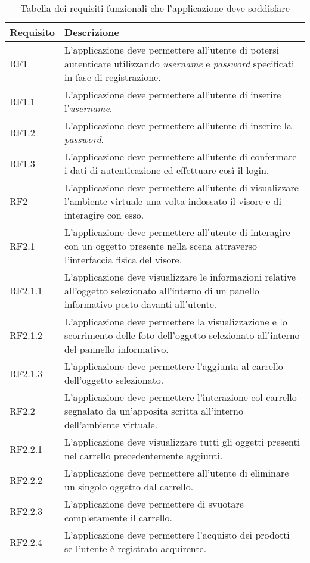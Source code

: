 \begin{table}
	\centering
	\label{tabella-requisiti}
	\begin{tabular}{| l | p{10cm} |}
		\hline
		\textbf{Requisito} & \textbf{Descrizione} \\ \hline
		RF1 & L'applicazione deve permettere all'utente di potersi autenticare utilizzando \textit{username} e \textit{password} specificati in fase di registrazione. \\ \hline
		RF1.1 & L'applicazione deve permettere all'utente di inserire l'\textit{username}. \\ \hline
		RF1.2 & L'applicazione deve permettere all'utente di inserire la \textit{password}. \\ \hline
		RF1.3 & L'applicazione deve permettere all'utente di confermare i dati di autenticazione ed effettuare così il login. \\ \hline
		RF2 & L'applicazione deve permettere all'utente di visualizzare l'ambiente virtuale una volta indossato il visore e di interagire con esso. \\ \hline
		RF2.1 & L'applicazione deve permettere all'utente di interagire con un oggetto presente nella scena attraverso l'interfaccia fisica del visore. \\ \hline
		RF2.1.1 & L'applicazione deve visualizzare le informazioni relative all'oggetto selezionato all'interno di un panello informativo posto davanti all'utente. \\ \hline
		RF2.1.2 & L'applicazione deve permettere la visualizzazione e lo scorrimento delle foto dell'oggetto selezionato all'interno del pannello informativo. \\ \hline
		RF2.1.3 & L'applicazione deve permettere l'aggiunta al carrello dell'oggetto selezionato. \\ \hline
		RF2.2 & L'applicazione deve permettere l'interazione col carrello segnalato da un'apposita scritta all'interno dell'ambiente virtuale. \\ \hline
		RF2.2.1 & L'applicazione deve visualizzare tutti gli oggetti presenti nel carrello precedentemente aggiunti. \\ \hline
		RF2.2.2 & L'applicazione deve permettere all'utente di eliminare un singolo oggetto dal carrello. \\ \hline
		RF2.2.3 & L'applicazione deve permettere di svuotare completamente il carrello. \\ \hline
		RF2.2.4 & L'applicazione deve permettere l'acquisto dei prodotti se l'utente è registrato acquirente. \\ 
		\hline
	\end{tabular}
	\caption{Tabella dei requisiti funzionali che l'applicazione deve soddisfare}
\end{table}
\FloatBarrier

